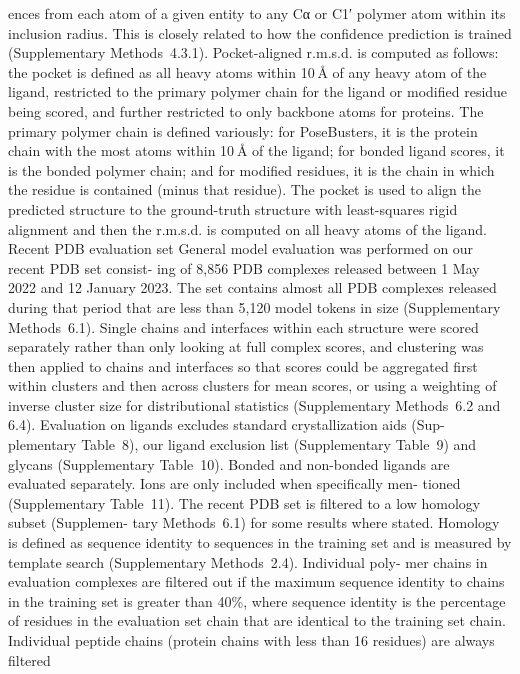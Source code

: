 ences from each atom of a given entity to any Cα or C1′ polymer atom
within its inclusion radius. This is closely related to how the confidence
prediction is trained (Supplementary Methods 4.3.1).
Pocket-aligned r.m.s.d. is computed as follows: the pocket is defined
as all heavy atoms within 10 Å of any heavy atom of the ligand, restricted
to the primary polymer chain for the ligand or modified residue being
scored, and further restricted to only backbone atoms for proteins.
The primary polymer chain is defined variously: for PoseBusters,
it is the protein chain with the most atoms within 10 Å of the ligand; for
bonded ligand scores, it is the bonded polymer chain; and for modified
residues, it is the chain in which the residue is contained (minus that
residue). The pocket is used to align the predicted structure to the
ground-truth structure with least-squares rigid alignment and then
the r.m.s.d. is computed on all heavy atoms of the ligand.
Recent PDB evaluation set
General model evaluation was performed on our recent PDB set consist-
ing of 8,856 PDB complexes released between 1 May 2022 and 12 January
2023. The set contains almost all PDB complexes released during that
period that are less than 5,120 model tokens in size (Supplementary
Methods 6.1). Single chains and interfaces within each structure were
scored separately rather than only looking at full complex scores, and
clustering was then applied to chains and interfaces so that scores could
be aggregated first within clusters and then across clusters for mean
scores, or using a weighting of inverse cluster size for distributional
statistics (Supplementary Methods 6.2 and 6.4).
Evaluation on ligands excludes standard crystallization aids (Sup-
plementary Table 8), our ligand exclusion list (Supplementary Table 9)
and glycans (Supplementary Table 10). Bonded and non-bonded ligands
are evaluated separately. Ions are only included when specifically men-
tioned (Supplementary Table 11).
The recent PDB set is filtered to a low homology subset (Supplemen-
tary Methods 6.1) for some results where stated. Homology is defined
as sequence identity to sequences in the training set and is measured
by template search (Supplementary Methods 2.4). Individual poly-
mer chains in evaluation complexes are filtered out if the maximum
sequence identity to chains in the training set is greater than 40\%, where
sequence identity is the percentage of residues in the evaluation set
chain that are identical to the training set chain. Individual peptide
chains (protein chains with less than 16 residues) are always filtered
